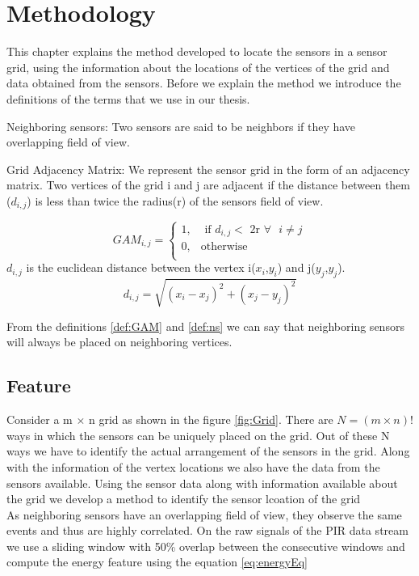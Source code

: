 \chapter{Methodology}

This chapter explains the method developed to locate the sensors in a sensor grid, using the information about the locations of the vertices of the grid and data obtained from the sensors. Before we explain the method we introduce the definitions of the terms that 
we use in our thesis.\\
\begin{definition}{Neighboring sensors:}
 Two sensors are said to be neighbors if they have overlapping field of view.
\label{def:ns}
\end{definition}
\begin{definition}{Grid Adjacency Matrix:}
 We represent the sensor grid in the form of an adjacency matrix. Two vertices of the grid i and j are adjacent if the distance between them ($d_{i,j}$) is less than twice the radius(r) of the sensors field of view.

\[
GAM_{i,j} = 
\begin{cases}
1, &\text{ if } d_{i,j} < \text{  2r } \forall \text{ } i \ne j\\
0, & \text{otherwise}\\
\end{cases}
	\]
$d_{i,j}$  is the euclidean distance between the vertex i($x_i$,$y_i$) and j($y_j$,$y_j$).
\begin{equation*}
d_{i,j}=\sqrt{(x_i-x_j)^2 + (x_j-y_j)^2}
\end{equation*}
\label{def:GAM}
\end{definition}
From the definitions \ref{def:GAM} and \ref{def:ns} we can say that neighboring sensors will always be placed on neighboring vertices. 
\section{Feature}
Consider a m $\times$ n grid as shown in the figure \ref{fig:Grid}. There are $N= (m\times n)!$ ways in which the sensors can be uniquely placed on the grid. Out of these N ways we have to identify the actual arrangement of the sensors in the grid.  Along with the information of the vertex locations we also have the data from the sensors available. Using the sensor data along with information available about the grid we develop a method to identify the sensor lcoation of the grid\\
As neighboring sensors have an overlapping field of view, they observe the same events and thus are highly correlated.
On the raw signals of the PIR data stream we use a sliding window with 50\% overlap between the consecutive windows and compute the energy feature using the equation \ref{eq:energyEq}

